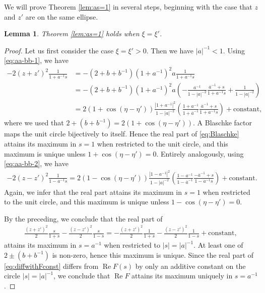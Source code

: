 \documentclass[%
 jmp,
cp,  %
 amsmath,amsthm,amssymb,%
 reprint,%
onecolumn]{revtex4-2}
\newtheorem{lemma}[theorem]{Lemma}
\begin{document}
We will prove Theorem \ref{lem:as=1} in several steps, beginning with the case that $z$ and $z'$ are on the same ellipse. 

\begin{lemma} \label{lem:as=1sameEllipse}
Theorem \ref{lem:as=1} holds when $\xi=\xi'$.
\end{lemma}

\begin{proof}
Let us first consider the case $\xi=\xi'>0$. Then we have $|a|^{-1}<1$. Using \eqref{eq:aa-bb-1}, we have
\begin{align} \nonumber
-2 (z+z')^2 \frac{1}{1+a^{-1} s} 
&= -(2+b+b^{-1}) (1+a^{-1})^2 a \frac{1}{1+a^{-1} s}\\ \nonumber
&= -(2+b+b^{-1}) (1+a^{-1})^2 a \left(-\frac{a^{-1}}{1-|a|^{-2}} \frac{\overline a^{-1} + s}{1+a^{-1} s} + \frac{1}{1-|a|^{-2}}\right)\\ \label{eq:Blaschke}
&= 2 (1 + \cos(\eta-\eta')) \frac{|1+a^{-1}|^2}{1-|a|^{-2}} \left(\frac{1+a^{-1}}{1+\overline a^{-1}} \frac{\overline a^{-1} + s}{1+a^{-1} s}\right) + \text{constant},
\end{align}
where we used that $2 + (b+b^{-1}) = 2 (1 + \cos(\eta-\eta'))$. A Blaschke factor maps the unit circle bijectively to itself. Hence the real part of \eqref{eq:Blaschke} attains its maximum in $s=1$ when restricted to the unit circle, and this maximum is unique unless $1+\cos(\eta-\eta')=0$. 
Entirely analogously, using \eqref{eq:aa-bb-2}, we have
\begin{align*}
-2 (z-z')^2 \frac{1}{1-a^{-1} s} 
=  2 (1 - \cos(\eta-\eta')) \frac{|1-a^{-1}|^2}{1-|a|^{-2}} \left(\frac{1-a^{-1}}{1-\overline a^{-1}} \frac{-\overline a^{-1} + s}{1-a^{-1} s}\right) + \text{constant}.
\end{align*}
Again, we infer that the real part attains its maximum in $s=1$ when restricted to the unit circle, and this maximum is unique unless $1 - \cos(\eta-\eta')=0$. 

By the preceding, we conclude that the real part of
\begin{align} \label{eq:diffwithFconst}
\frac{(z+z')^2}{2} \frac{s}{1+s}
- \frac{(z-z')^2}{2} \frac{s}{1-s}
= -\frac{(z+z')^2}{2} \frac{1}{1+s}
- \frac{(z-z')^2}{2} \frac{1}{1-s} + \text{constant},
\end{align}
attains its maximum in $s=a^{-1}$ when restricted to $|s|=|a|^{-1}$.  At least one of $2 \pm (b+b^{-1})$ is non-zero, hence this maximum is unique. Since the real part of \eqref{eq:diffwithFconst} differs from $\operatorname{Re} F(s)$ by only an additive constant on the circle $|s|=|a|^{-1}$, we conclude that $\operatorname{Re} F$ attains its maximum uniquely in $s=a^{-1}$. 


\end{proof}
\end{document}
